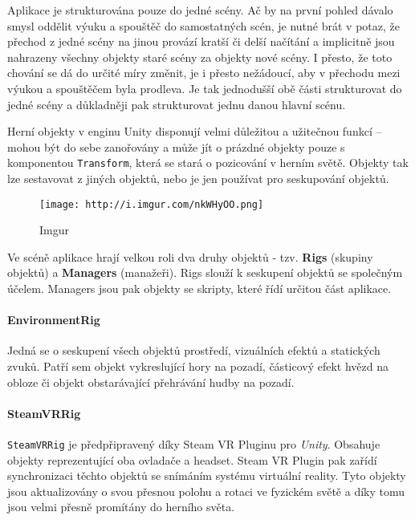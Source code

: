 Aplikace je strukturována pouze do jedné scény. Ač by na první pohled
dávalo smysl oddělit výuku a spouštěč do samostatných scén, je nutné
brát v potaz, že přechod z jedné scény na jinou provází kratší či delší
načítání a implicitně jsou nahrazeny všechny objekty staré scény za
objekty nové scény. I přesto, že toto chování se dá do určité míry
změnit, je i přesto nežádoucí, aby v přechodu mezi výukou a spouštěčem
byla prodleva. Je tak jednodušší obě části strukturovat do jedné scény a
důkladněji pak strukturovat jednu danou hlavní scénu.

Herní objekty v enginu Unity disponují velmi důležitou a užitečnou
funkcí -- mohou být do sebe zanořovány a může jít o prázdné objekty
pouze s komponentou \texttt{Transform}, která se stará o pozicování v
herním světě. Objekty tak lze sestavovat z jiných objektů, nebo je jen
používat pro seskupování objektů.

\begin{figure}
\centering
\texttt{[image: http://i.imgur.com/nkWHyOO.png]}
\caption{Imgur}
\end{figure}

Ve scéně aplikace hrají velkou roli dva druhy objektů - tzv.
\textbf{Rigs} (skupiny objektů) a \textbf{Managers} (manažeři). Rigs
slouží k seskupení objektů se společným účelem. Managers jsou pak
objekty se skripty, které řídí určitou část aplikace.

\paragraph{EnvironmentRig}\label{environmentrig}

Jedná se o seskupení všech objektů prostředí, vizuálních efektů a
statických zvuků. Patří sem objekt vykreslující hory na pozadí,
částicový efekt hvězd na obloze či objekt obstarávající přehrávání hudby
na pozadí.

\paragraph{SteamVRRig}\label{steamvrrig}

\texttt{SteamVRRig} je předpřipravený díky Steam VR Pluginu pro
\emph{Unity}. Obsahuje objekty reprezentující oba ovladače a headset.
Steam VR Plugin pak zařídí synchronizaci těchto objektů se snímáním
systému virtuální reality. Tyto objekty jsou aktualizovány o svou
přesnou polohu a rotaci ve fyzickém světě a díky tomu jsou velmi přesně
promítány do herního světa.


